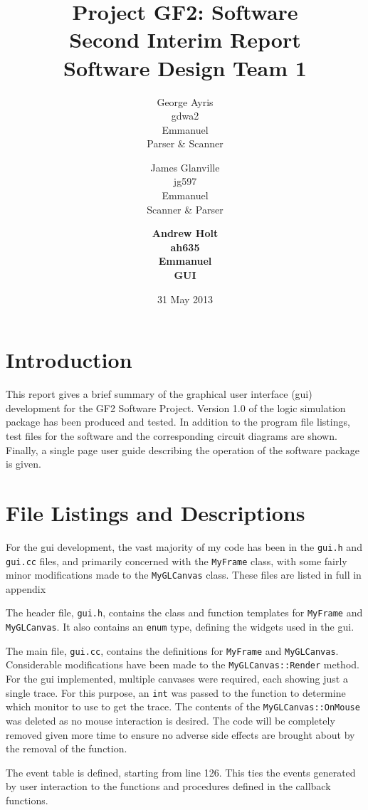 \documentclass[a4paper,10pt]{article}  %
\title{Project GF2: Software\\ Second Interim Report\\ Software Design
  Team 1}
\author{George Ayris\\ gdwa2\\ Emmanuel \\ Parser \& Scanner \and James Glanville\\
jg597\\ Emmanuel \\ Scanner \& Parser \and \textbf{Andrew Holt}\\
\textbf{ah635}\\ \textbf{Emmanuel}\\ \textbf{GUI}}
\date{31 May 2013}
\begin{document}
\maketitle

\section{Introduction}
\label{sec:introduction}

This report gives a brief summary of the graphical user interface
(gui) development for the GF2 Software Project. Version 1.0 of the
logic simulation package has been produced and tested. In addition to
the program file listings, test files for the software and the
corresponding circuit diagrams are shown. Finally, a single page user
guide describing the operation of the software package is given.

\section{File Listings and Descriptions}
\label{sec:file-list-descr}

For the gui development, the vast majority of my code has been in the
\texttt{gui.h} and \texttt{gui.cc} files, and primarily concerned with
the \texttt{MyFrame} class, with some fairly minor modifications made
to the \texttt{MyGLCanvas} class. These files are listed in full in
appendix 

The header file, \texttt{gui.h}, contains the class and function
templates for \texttt{MyFrame} and \texttt{MyGLCanvas}. It also
contains an \texttt{enum} type, defining the widgets used in the gui.

The main file, \texttt{gui.cc}, contains the definitions for
\texttt{MyFrame} and \texttt{MyGLCanvas}. Considerable modifications
have been made to the \texttt{MyGLCanvas::Render} method. For the gui
implemented, multiple canvases were required, each showing just a
single trace. For this purpose, an \texttt{int} was passed to the
function to determine which monitor to use to get the trace. The
contents of the \texttt{MyGLCanvas::OnMouse} was deleted as no mouse
interaction is desired. The code will be completely removed given more
time to ensure no adverse side effects are brought about by the
removal of the function.

The event table is defined, starting from line 126. This ties the
events generated by user interaction to the functions and
procedures defined in the callback functions.
\end{document}

